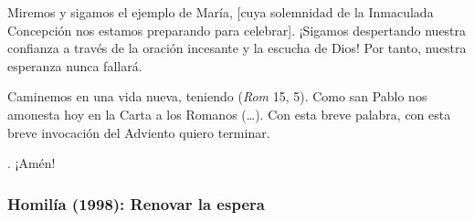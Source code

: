 \begin{body}
					Miremos y sigamos el ejemplo de María, {[}cuya solemnidad de la Inmaculada Concepción nos estamos preparando para celebrar{]}. ¡Sigamos despertando nuestra confianza a través de la oración incesante y la escucha de Dios! Por tanto, nuestra esperanza nunca fallará. 
					
					Caminemos en una vida nueva, teniendo  (\emph{Rom} 15, 5). Como san Pablo nos amonesta hoy en la Carta a los Romanos (\ldots{}). Con esta breve palabra, con esta breve invocación del Adviento quiero terminar. 
					
					. ¡Amén!
				\end{body}
			
			\subsubsection{Homilía (1998): Renovar la espera}
			
				
